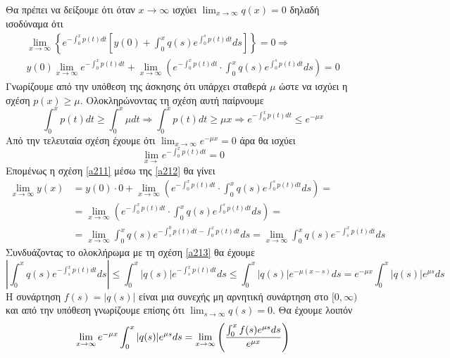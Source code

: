 \documentclass[a4paper,twoside,11pt]{book}
\DeclareRobustCommand{\frac}[3][0pt]{%
{\begingroup\hspace{#1}#2\hspace{#1}\endgroup\over\hspace{#1}#3\hspace{#1}}}
\begin{document}
Θα πρέπει να δείξουμε ότι όταν $ x\rightarrow\infty $ ισχύει $ \displaystyle{\lim_{x\rightarrow\infty}q(x)=0} $ δηλαδή ισοδύναμα ότι
\begin{gather}
\lim_{x\rightarrow\infty}\left\lbrace e^{-\int_{0}^{x}{p(t)dt}}\left[y(0)+\int_{0}^{x}{q(s)e^{\int_{0}^{s}{p(t)dt}}ds} \right] \right\rbrace=0\Rightarrow\nonumber\\\label{a211}
y(0)\lim_{x\rightarrow\infty} e^{-\int_{0}^{x}{p(t)dt}}+\lim_{x\rightarrow\infty}\left(e^{-\int_{0}^{x}{p(t)dt}}\cdot \int_{0}^{x}{q(s)e^{\int_{0}^{s}{p(t)dt}}ds}\right)=0
\end{gather}
Γνωρίζουμε από την υπόθεση της άσκησης ότι υπάρχει σταθερά $ \mu $ ώστε να ισχύει η σχέση $ p(x)\geq\mu $. Ολοκληρώνοντας τη σχέση αυτή παίρνουμε
\begin{equation}\label{a213}
\int_{0}^{x}{p(t)dt}\geq\int_{0}^{x}{\mu dt}\Rightarrow \int_{0}^{x}{p(t)dt}\geq\mu x\Rightarrow e^{-\int_{0}^{x}{p(t)dt}}\leq e^{-\mu x}
\end{equation}
Από την τελευταία σχέση έχουμε ότι $ \displaystyle{\lim_{x\rightarrow\infty}e^{-\mu x}=0} $ άρα θα ισχύει
\begin{equation}\label{a212}
\lim_{x\rightarrow}{e^{-\int_{0}^{x}{p(t)dt}}}=0
\end{equation}
Επομένως η σχέση \eqref{a211} μέσω της \eqref{a212} θα γίνει
\begin{align}
\lim_{x\rightarrow\infty}{y(x)}&=y(0)\cdot0+\lim_{x\rightarrow\infty}\left(e^{-\int_{0}^{x}{p(t)dt}}\cdot \int_{0}^{x}{q(s)e^{\int_{0}^{s}{p(t)dt}}ds}\right)=\\
&=\lim_{x\rightarrow\infty}\left(e^{-\int_{0}^{x}{p(t)dt}}\cdot \int_{0}^{x}{q(s)e^{\int_{0}^{s}{p(t)dt}}ds}\right)=\\
&=\lim_{x\rightarrow\infty}\int_{0}^{x}{q(s)e^{-\int_{s}^{0}{p(t)dt}-\int_{0}^{x}{p(t)dt}}ds}=\lim_{x\rightarrow\infty}\int_{0}^{x}{q(s)e^{-\int_{s}^{x}{p(t)dt}}ds}
\end{align}
Συνδυάζοντας το ολοκλήρωμα με τη σχέση \eqref{a213} θα έχουμε 
\[ \left|\int_{0}^{x}q(s)e^{-\int_{s}^{x}{p(t)dt}}ds \right|\leq\int_{0}^{x}|q(s)|e^{-\int_{s}^{x}{p(t)dt}}ds\leq\int_{0}^{x}|q(s)|e^{-\mu(x-s)}ds=e^{-\mu x}\int_{0}^{x}|q(s)|e^{\mu s}ds \]
Η συνάρτηση $ f(s)=|q(s)| $ είναι μια συνεχής μη αρνητική συνάρτηση στο $ [0,\infty) $ και από την υπόθεση γνωρίζουμε επίσης ότι $ \displaystyle{\lim_{s\rightarrow\infty}q(s)=0} $. Θα έχουμε λοιπόν
\[ \lim_{x\rightarrow\infty}{e^{-\mu x}\int_{0}^{x}|q(s)|e^{\mu s}ds}=\lim_{x\rightarrow\infty}{\left(\frac{\int_{0}^{x}f(s)e^{\mu s}ds}{e^{\mu x}}\right)} \]
\end{document}
